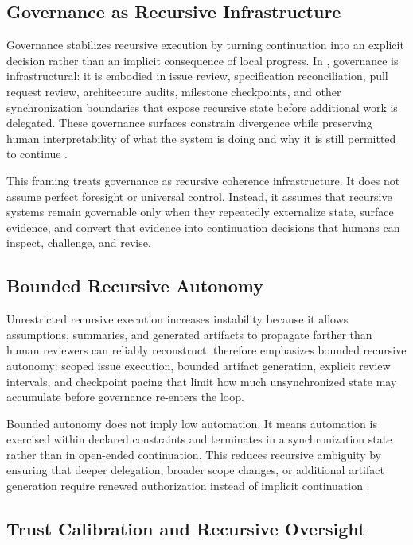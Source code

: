 \subsection{Governance as Recursive Infrastructure}

Governance stabilizes recursive execution by turning continuation into an explicit decision rather than an implicit consequence of local progress. In , governance is infrastructural: it is embodied in issue review, specification reconciliation, pull request review, architecture audits, milestone checkpoints, and other synchronization boundaries that expose recursive state before additional work is delegated. These governance surfaces constrain divergence while preserving human interpretability of what the system is doing and why it is still permitted to continue \cite{Wiener1948Cybernetics,Shneiderman2020HCAI}.

This framing treats governance as recursive coherence infrastructure. It does not assume perfect foresight or universal control. Instead, it assumes that recursive systems remain governable only when they repeatedly externalize state, surface evidence, and convert that evidence into continuation decisions that humans can inspect, challenge, and revise.

\subsection{Bounded Recursive Autonomy}

Unrestricted recursive execution increases instability because it allows assumptions, summaries, and generated artifacts to propagate farther than human reviewers can reliably reconstruct.  therefore emphasizes bounded recursive autonomy: scoped issue execution, bounded artifact generation, explicit review intervals, and checkpoint pacing that limit how much unsynchronized state may accumulate before governance re-enters the loop.

Bounded autonomy does not imply low automation. It means automation is exercised within declared constraints and terminates in a synchronization state rather than in open-ended continuation. This reduces recursive ambiguity by ensuring that deeper delegation, broader scope changes, or additional artifact generation require renewed authorization instead of implicit continuation \cite{Amershi2014InteractiveML,Simon1957ModelsMan}.

\subsection{Trust Calibration and Recursive Oversight}

